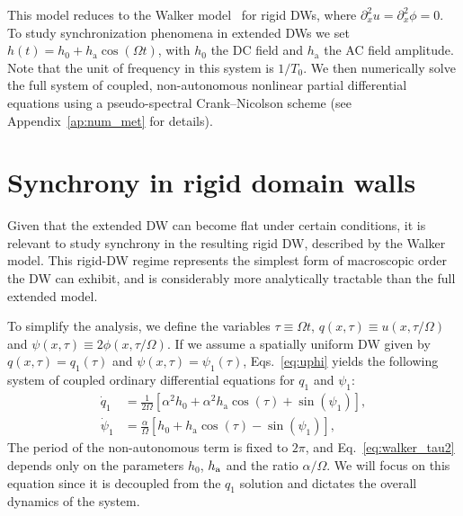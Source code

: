 \documentclass[prb,aps,twocolumn,superscriptaddress,floatfix]{revtex4-1}
\begin{document}
This model reduces to the Walker model~\cite{Schryer1974} for rigid DWs, where $\partial ^2_xu=\partial^2_x\phi=0$. To study synchronization phenomena in extended DWs we set $h(t)=h_\text{0}+h_\text{a}\cos\left(\Omega t\right)$, with $h_{0}$ the DC field and $h_{\text{a}}$ the AC field amplitude. Note that the unit of frequency in this system is $1/T_0$. We then numerically solve the full system of coupled, non-autonomous nonlinear partial differential equations using a pseudo-spectral Crank--Nicolson scheme (see Appendix~\ref{ap:num_met} for details).

\section{Synchrony in rigid domain walls}
\label{sec:flat_sync}

Given that the extended DW can become flat under certain conditions, it is relevant to study synchrony in the resulting rigid DW, described by the Walker model. This rigid-DW regime represents the simplest form of macroscopic order the DW can exhibit, and is considerably more analytically tractable than the full extended model.

To simplify the analysis, we define the variables $\tau\equiv\Omega t$, $q(x,\tau)\equiv  u(x,\tau/\Omega)$ and $\psi(x,\tau)\equiv2\phi(x,\tau/\Omega)$. If we assume a spatially uniform DW given by $q(x,\tau)=q_1(\tau)$ and $\psi(x,\tau)=\psi_1(\tau)$, Eqs.~\eqref{eq:uphi} yields the following system of coupled ordinary differential equations for $q_1$ and $\psi_1$:
%
\begin{align}
    \dot{q}_1 &= \frac 1 {2\Omega} \left[ \alpha ^2h_0+\alpha^2h_\text{a}\cos(\tau) + \sin (\psi_1)\right], 
    \label{eq:walker_tau1}
    \\
    \dot \psi_1 &= \frac \alpha \Omega \left[ h_0 +  h_\text{a}\cos(\tau) - \sin(\psi_1) \right],
    \label{eq:walker_tau2}
\end{align}
%
The period of the non-autonomous term is fixed to $2\pi$, and Eq.~\eqref{eq:walker_tau2} depends only on the parameters $h_0$, $h_\text a$ and the ratio $\alpha/\Omega$. We will focus on this equation since it is decoupled from the $q_1$ solution and dictates the overall dynamics of the system.
\end{document}
